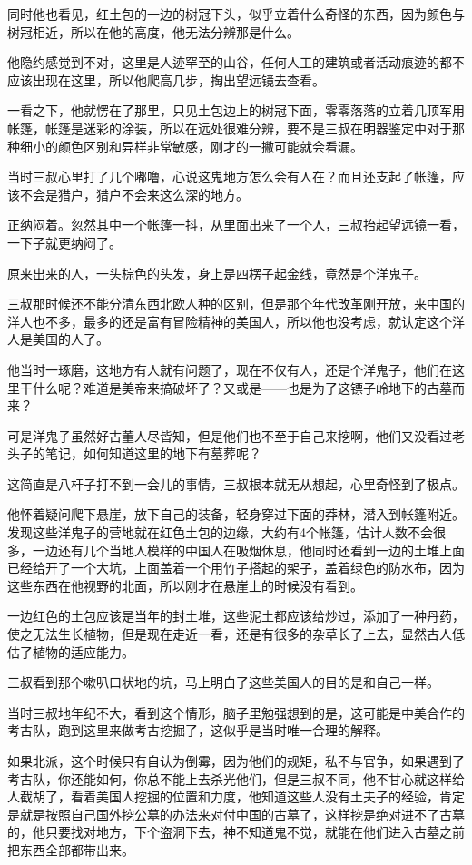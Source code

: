 同时他也看见，红土包的一边的树冠下头，似乎立着什么奇怪的东西，因为颜色与树冠相近，所以在他的高度，他无法分辨那是什么。

他隐约感觉到不对，这里是人迹罕至的山谷，任何人工的建筑或者活动痕迹的都不应该出现在这里，所以他爬高几步，掏出望远镜去查看。

一看之下，他就愣在了那里，只见土包边上的树冠下面，零零落落的立着几顶军用帐篷，帐篷是迷彩的涂装，所以在远处很难分辨，要不是三叔在明器鉴定中对于那种细小的颜色区别和异样非常敏感，刚才的一撇可能就会看漏。

当时三叔心里打了几个嘟噜，心说这鬼地方怎么会有人在？而且还支起了帐篷，应该不会是猎户，猎户不会来这么深的地方。

正纳闷着。忽然其中一个帐篷一抖，从里面出来了一个人，三叔抬起望远镜一看，一下子就更纳闷了。

原来出来的人，一头棕色的头发，身上是四楞子起金线，竟然是个洋鬼子。

三叔那时候还不能分清东西北欧人种的区别，但是那个年代改革刚开放，来中国的洋人也不多，最多的还是富有冒险精神的美国人，所以他也没考虑，就认定这个洋人是美国的人了。

他当时一琢磨，这地方有人就有问题了，现在不仅有人，还是个洋鬼子，他们在这里干什么呢？难道是美帝来搞破坏了？又或是——也是为了这镖子岭地下的古墓而来？

可是洋鬼子虽然好古董人尽皆知，但是他们也不至于自己来挖啊，他们又没看过老头子的笔记，如何知道这里的地下有墓葬呢？

这简直是八杆子打不到一会儿的事情，三叔根本就无从想起，心里奇怪到了极点。

他怀着疑问爬下悬崖，放下自己的装备，轻身穿过下面的莽林，潜入到帐篷附近。发现这些洋鬼子的营地就在红色土包的边缘，大约有4个帐篷，估计人数不会很多，一边还有几个当地人模样的中国人在吸烟休息，他同时还看到一边的土堆上面已经给开了一个大坑，上面盖着一个用竹子搭起的架子，盖着绿色的防水布，因为这些东西在他视野的北面，所以刚才在悬崖上的时候没有看到。

一边红色的土包应该是当年的封土堆，这些泥土都应该给炒过，添加了一种丹药，使之无法生长植物，但是现在走近一看，还是有很多的杂草长了上去，显然古人低估了植物的适应能力。

三叔看到那个嗽叭口状地的坑，马上明白了这些美国人的目的是和自己一样。

当时三叔地年纪不大，看到这个情形，脑子里勉强想到的是，这可能是中美合作的考古队，跑到这里来做考古挖掘了，这似乎是当时唯一合理的解释。

如果北派，这个时候只有自认为倒霉，因为他们的规矩，私不与官争，如果遇到了考古队，你还能如何，你总不能上去杀光他们，但是三叔不同，他不甘心就这样给人截胡了，看着美国人挖掘的位置和力度，他知道这些人没有土夫子的经验，肯定是就是按照自己国外挖公墓的办法来对付中国的古墓了，这样挖是绝对进不了古墓的，他只要找对地方，下个盗洞下去，神不知道鬼不觉，就能在他们进入古墓之前把东西全部都带出来。

